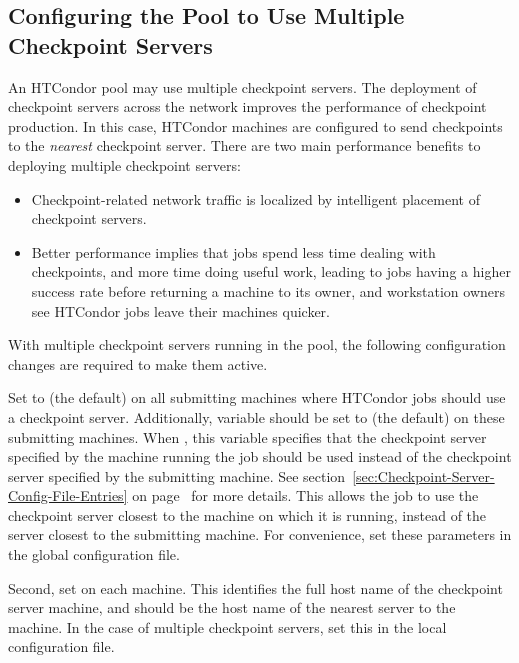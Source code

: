 \subsection{\label{Configure-Multiple-Ckpt-Server} 
Configuring the Pool to Use Multiple Checkpoint Servers}


An HTCondor pool may use multiple checkpoint servers.
The deployment of
checkpoint servers across the
network improves the performance of checkpoint production.
In this case, HTCondor machines are configured to send checkpoints to the
\emph{nearest} checkpoint server.
There are two main performance benefits to deploying multiple checkpoint
servers:
\begin{itemize}
\item Checkpoint-related network traffic is localized by
intelligent placement of checkpoint servers.
\item Better performance implies that jobs spend less time
dealing with checkpoints, and more time doing useful work,
leading to jobs having a higher success rate before returning a
machine to its owner, and workstation
owners see HTCondor jobs leave their machines quicker.
\end{itemize}

With multiple checkpoint servers running in the pool, the
following configuration changes are required to make them active.

Set  to  (the default) on all
submitting machines where HTCondor jobs should use a checkpoint server.
Additionally, variable  should be set to
 (the default) on these submitting machines.
When , this variable specifies that the checkpoint server
specified by the machine running the job should be used instead of the
checkpoint server specified by the submitting machine.
See section~\ref{sec:Checkpoint-Server-Config-File-Entries} on
page~\pageref{sec:Checkpoint-Server-Config-File-Entries} for more
details.
This allows the job to use the checkpoint server closest to the
machine on which it is running, instead of the server closest to the
submitting machine.
For convenience, set these parameters in the
global configuration file.

Second, set  on each machine.
This identifies the full host name of the checkpoint server machine,
and should be the host name of the nearest server to the machine.
In the case of multiple checkpoint servers, set this
in the local configuration file.

